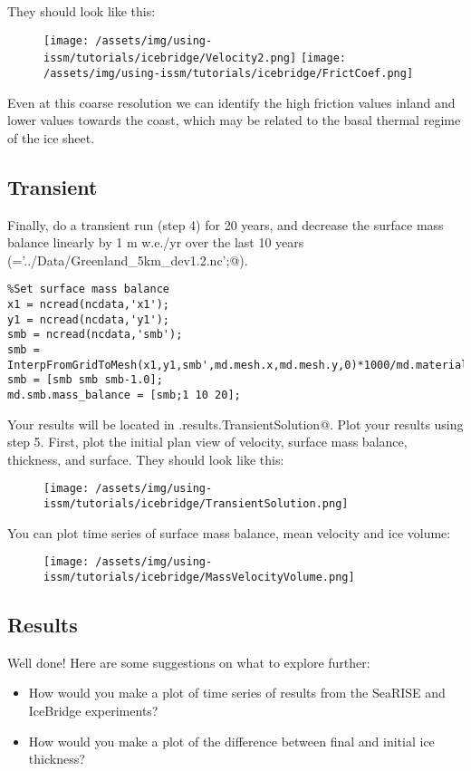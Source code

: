 They should look like this:
\begin{figure}[H]
	\begin{center}
		\texttt{[image: /assets/img/using-issm/tutorials/icebridge/Velocity2.png]}
		\texttt{[image: /assets/img/using-issm/tutorials/icebridge/FrictCoef.png]}
	\end{center}
\end{figure}
Even at this coarse resolution we can identify the high friction values inland and lower values towards the coast, which may be related to the basal thermal regime of the ice sheet.

\subsection{Transient} %
Finally, do a transient run (step 4) for 20 years, and decrease the surface mass balance linearly by 1 m w.e./yr over the last 10 years (\verb@ncdata='../Data/Greenland_5km_dev1.2.nc';@).
\begin{verbatim}%Set surface mass balance
x1 = ncread(ncdata,'x1');
y1 = ncread(ncdata,'y1');
smb = ncread(ncdata,'smb');
smb = InterpFromGridToMesh(x1,y1,smb',md.mesh.x,md.mesh.y,0)*1000/md.materials.rho_ice;
smb = [smb smb smb-1.0];
md.smb.mass_balance = [smb;1 10 20];\end{verbatim}

Your results will be located in \verb@md.results.TransientSolution@. Plot your results using step 5. First, plot the initial plan view of velocity, surface mass balance, thickness, and surface. They should look like this:
\begin{figure}[H]
	\begin{center}
		\texttt{[image: /assets/img/using-issm/tutorials/icebridge/TransientSolution.png]}
	\end{center}
\end{figure}
You can plot time series of surface mass balance, mean velocity and ice volume:
\begin{figure}[H]
	\begin{center}
		\texttt{[image: /assets/img/using-issm/tutorials/icebridge/MassVelocityVolume.png]}
	\end{center}
\end{figure}

\subsection{Results} %
Well done! Here are some suggestions on what to explore further:
\begin{itemize}
	\item How would you make a plot of time series of results from the SeaRISE and IceBridge experiments?
	\item How would you make a plot of the difference between final and initial ice thickness?
\end{itemize}
